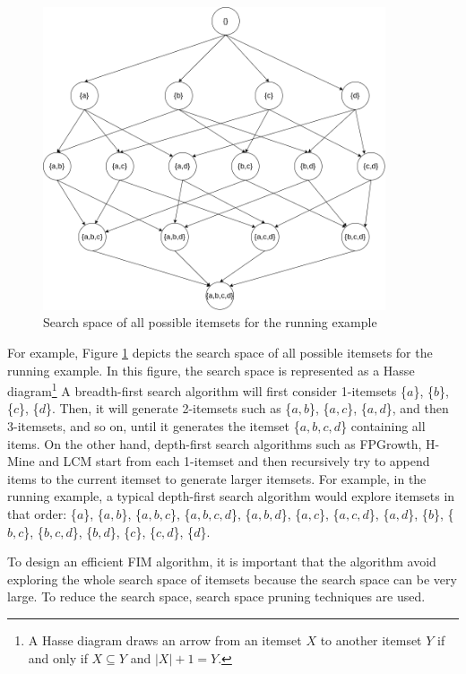 \begin{figure}
    \caption{Search space of all possible itemsets for the running example}
    \label{fig:search_space}
    \centering
    \includegraphics[width=0.9\textwidth]{chapter1/image/space.png}
\end{figure}

For example, Figure \ref{fig:search_space} depicts the search space of all possible itemsets for the
running example. In this figure, the search space is represented as
a Hasse diagram\footnote{A Hasse diagram draws an arrow from an itemset $X$ to another itemset $Y$ if and only if $X \subseteq Y$ and $|X| + 1 = Y$.}
A breadth-first search algorithm will first consider 1-itemsets \{$a$\}, \{$b$\}, \{$c$\}, \{$d$\}. Then,
it will generate 2-itemsets such as \{$a, b$\}, \{$a, c$\}, \{$a, d$\}, and then 3-itemsets, and so on, until it
generates the itemset \{$a, b, c, d$\} containing all items. On the other hand, depth-first search
algorithms such as FPGrowth, H-Mine and LCM start from each 1-itemset and then recursively try to append items to the current itemset to generate larger itemsets.
For example, in the running example, a typical depth-first search algorithm would explore itemsets in that
order: \{$a$\}, \{$a, b$\}, \{$a, b, c$\}, \{$a, b, c, d$\}, \{$a, b, d$\},
\{$a, c$\}, \{$a, c, d$\}, \{$a, d$\}, \{$b$\}, \{$b, c$\}, \{$b, c, d$\},
\{$b, d$\}, \{$c$\}, \{$c, d$\}, \{$d$\}.

To design an efficient FIM algorithm, it is important that the algorithm avoid exploring
the whole search space of itemsets because the search space can be very large. To reduce
the search space, search space pruning techniques are used.


